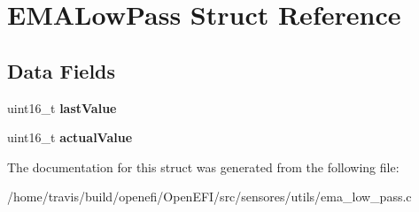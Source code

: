 \hypertarget{structEMALowPass}{}\section{E\+M\+A\+Low\+Pass Struct Reference}
\label{structEMALowPass}
\subsection*{Data Fields}
\begin{DoxyCompactItemize}
\item 
\mbox{\label{structEMALowPass_a73f50a2d936f1cb4f1fbdd7e71fce863}} 
uint16\+\_\+t {\bfseries last\+Value}
\item 
\mbox{\label{structEMALowPass_a7747b0ecc32c8720e49bb2ca9247735b}} 
uint16\+\_\+t {\bfseries actual\+Value}
\end{DoxyCompactItemize}


The documentation for this struct was generated from the following file\+:\begin{DoxyCompactItemize}
\item 
/home/travis/build/openefi/\+Open\+E\+F\+I/src/sensores/utils/ema\+\_\+low\+\_\+pass.\+c\end{DoxyCompactItemize}
